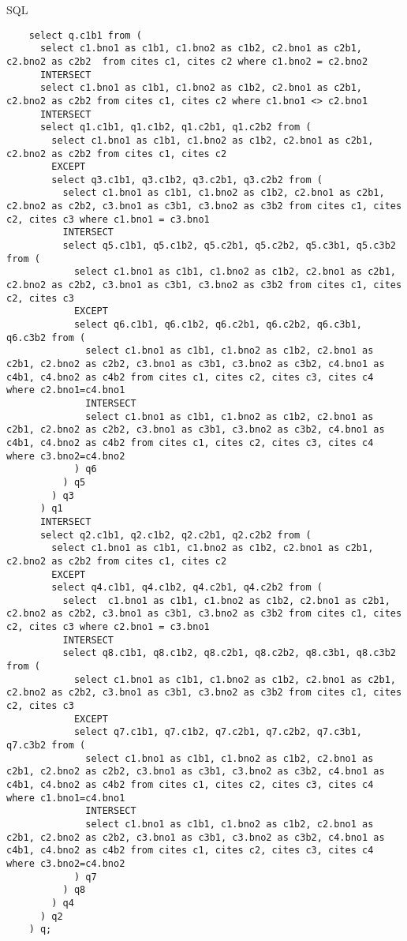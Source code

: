 \documentclass{article}
\begin{document}
  \vspace{10pt}
  \noindent\small{SQL}

  \tiny{
    \begin{verbatim}
    select q.c1b1 from (
      select c1.bno1 as c1b1, c1.bno2 as c1b2, c2.bno1 as c2b1, c2.bno2 as c2b2  from cites c1, cites c2 where c1.bno2 = c2.bno2
      INTERSECT
      select c1.bno1 as c1b1, c1.bno2 as c1b2, c2.bno1 as c2b1, c2.bno2 as c2b2 from cites c1, cites c2 where c1.bno1 <> c2.bno1
      INTERSECT
      select q1.c1b1, q1.c1b2, q1.c2b1, q1.c2b2 from (
        select c1.bno1 as c1b1, c1.bno2 as c1b2, c2.bno1 as c2b1, c2.bno2 as c2b2 from cites c1, cites c2
        EXCEPT
        select q3.c1b1, q3.c1b2, q3.c2b1, q3.c2b2 from (
          select c1.bno1 as c1b1, c1.bno2 as c1b2, c2.bno1 as c2b1, c2.bno2 as c2b2, c3.bno1 as c3b1, c3.bno2 as c3b2 from cites c1, cites c2, cites c3 where c1.bno1 = c3.bno1
          INTERSECT
          select q5.c1b1, q5.c1b2, q5.c2b1, q5.c2b2, q5.c3b1, q5.c3b2 from (
            select c1.bno1 as c1b1, c1.bno2 as c1b2, c2.bno1 as c2b1, c2.bno2 as c2b2, c3.bno1 as c3b1, c3.bno2 as c3b2 from cites c1, cites c2, cites c3
            EXCEPT
            select q6.c1b1, q6.c1b2, q6.c2b1, q6.c2b2, q6.c3b1, q6.c3b2 from (
              select c1.bno1 as c1b1, c1.bno2 as c1b2, c2.bno1 as c2b1, c2.bno2 as c2b2, c3.bno1 as c3b1, c3.bno2 as c3b2, c4.bno1 as c4b1, c4.bno2 as c4b2 from cites c1, cites c2, cites c3, cites c4 where c2.bno1=c4.bno1 
              INTERSECT
              select c1.bno1 as c1b1, c1.bno2 as c1b2, c2.bno1 as c2b1, c2.bno2 as c2b2, c3.bno1 as c3b1, c3.bno2 as c3b2, c4.bno1 as c4b1, c4.bno2 as c4b2 from cites c1, cites c2, cites c3, cites c4 where c3.bno2=c4.bno2
            ) q6
          ) q5
        ) q3
      ) q1
      INTERSECT
      select q2.c1b1, q2.c1b2, q2.c2b1, q2.c2b2 from (
        select c1.bno1 as c1b1, c1.bno2 as c1b2, c2.bno1 as c2b1, c2.bno2 as c2b2 from cites c1, cites c2
        EXCEPT
        select q4.c1b1, q4.c1b2, q4.c2b1, q4.c2b2 from (
          select  c1.bno1 as c1b1, c1.bno2 as c1b2, c2.bno1 as c2b1, c2.bno2 as c2b2, c3.bno1 as c3b1, c3.bno2 as c3b2 from cites c1, cites c2, cites c3 where c2.bno1 = c3.bno1
          INTERSECT
          select q8.c1b1, q8.c1b2, q8.c2b1, q8.c2b2, q8.c3b1, q8.c3b2 from (
            select c1.bno1 as c1b1, c1.bno2 as c1b2, c2.bno1 as c2b1, c2.bno2 as c2b2, c3.bno1 as c3b1, c3.bno2 as c3b2 from cites c1, cites c2, cites c3
            EXCEPT
            select q7.c1b1, q7.c1b2, q7.c2b1, q7.c2b2, q7.c3b1, q7.c3b2 from (
              select c1.bno1 as c1b1, c1.bno2 as c1b2, c2.bno1 as c2b1, c2.bno2 as c2b2, c3.bno1 as c3b1, c3.bno2 as c3b2, c4.bno1 as c4b1, c4.bno2 as c4b2 from cites c1, cites c2, cites c3, cites c4 where c1.bno1=c4.bno1 
              INTERSECT
              select c1.bno1 as c1b1, c1.bno2 as c1b2, c2.bno1 as c2b1, c2.bno2 as c2b2, c3.bno1 as c3b1, c3.bno2 as c3b2, c4.bno1 as c4b1, c4.bno2 as c4b2 from cites c1, cites c2, cites c3, cites c4 where c3.bno2=c4.bno2
            ) q7
          ) q8
        ) q4
      ) q2
    ) q;
    \end{verbatim}
  }
\end{document}
